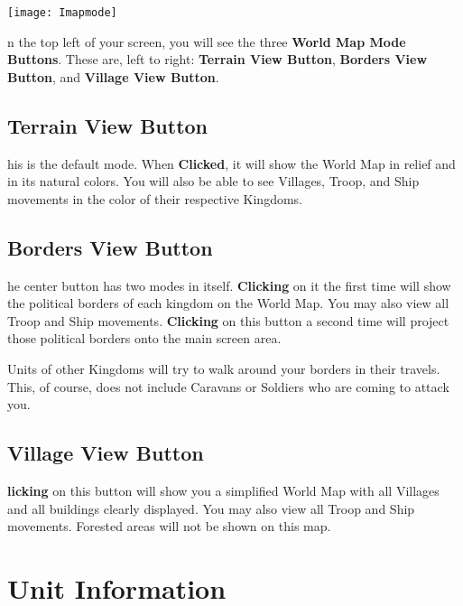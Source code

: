 {\begin{center}
    \texttt{[image: Imapmode]} %
\end{center}

n the top left of your screen, you will see the three \textbf{World Map Mode Buttons}. These are, left to right: \textbf{Terrain View Button}, \textbf{Borders View Button}, and \textbf{Village View Button}.

\subsection{\textsf{Terrain View Button}}


his is the default mode. When \textbf{Clicked}, it will show the World Map in relief and in its natural colors. You will also be able to see Villages, Troop, and Ship movements in the color of their respective Kingdoms.

\subsection{\textsf{Borders View Button}}


he center button has two modes in itself. \textbf{Clicking} on it the first time will show the political borders of each kingdom on the World Map. You may also view all Troop and Ship movements. \textbf{Clicking} on this button a second time will project those political borders onto the main screen area.

Units of other Kingdoms will try to walk around your borders in their travels. This, of course, does not include Caravans or Soldiers who are coming to attack you.

\subsection{\textsf{Village View Button}}


\textbf{licking} on this button will show you a simplified World Map with all Villages and all buildings clearly displayed. You may also view all Troop and Ship movements. Forested areas will not be shown on this map.

\section{\textsf{Unit Information}}

}
